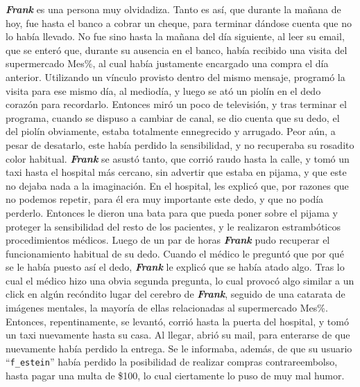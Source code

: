 \textbf{\emph{Frank}} es una persona muy olvidadiza. Tanto es así, que durante
la mañana de hoy, fue hasta el banco a cobrar un cheque, para terminar dándose
cuenta que no lo había llevado. No fue sino hasta la mañana del día siguiente,
al leer su email, que se enteró que, durante su ausencia en el banco, había
recibido una visita del supermercado Mes\%, al cual había justamente encargado
una compra el día anterior. Utilizando un vínculo provisto dentro del mismo
mensaje, programó la visita para ese mismo día, al mediodía, y luego se ató un
piolín en el dedo corazón para recordarlo. Entonces miró un poco de televisión,
y tras terminar el programa, cuando se dispuso a cambiar de canal, se dio cuenta
que su dedo, el del piolín obviamente, estaba totalmente ennegrecido y arrugado.
Peor aún, a pesar de desatarlo, este había perdido la sensibilidad, y no
recuperaba su rosadito color habitual. \textbf{\emph{Frank}} se asustó tanto,
que corrió raudo hasta la calle, y tomó un taxi hasta el hospital más cercano,
sin advertir que estaba en pijama, y que este no dejaba nada a la imaginación.
En el hospital, les explicó que, por razones que no podemos repetir, para él era
muy importante este dedo, y que no podía perderlo. Entonces le dieron una bata
para que pueda poner sobre el pijama y proteger la sensibilidad del resto de los
pacientes, y le realizaron estrambóticos procedimientos médicos. Luego de un par
de horas \textbf{\emph{Frank}} pudo recuperar el funcionamiento habitual de su
dedo. Cuando el médico le preguntó que por qué se le había puesto así el dedo,
\textbf{\emph{Frank}} le explicó que se había atado algo. Tras lo cual el médico
hizo una obvia segunda pregunta, lo cual provocó algo similar a un click en
algún recóndito lugar del cerebro de \textbf{\emph{Frank}}, seguido de una
catarata de imágenes mentales, la mayoría de ellas relacionadas al supermercado
Mes\%. Entonces, repentinamente, se levantó, corrió hasta la puerta del
hospital, y tomó un taxi nuevamente hasta su casa. Al llegar, abrió su mail,
para enterarse de que nuevamente había perdido la entrega. Se le informaba,
además, de que su usuario ``\texttt{f\_estein}'' había perdido la posibilidad de
realizar compras contrareembolso, hasta pagar una multa de \$100, lo cual
ciertamente lo puso de muy mal humor.

